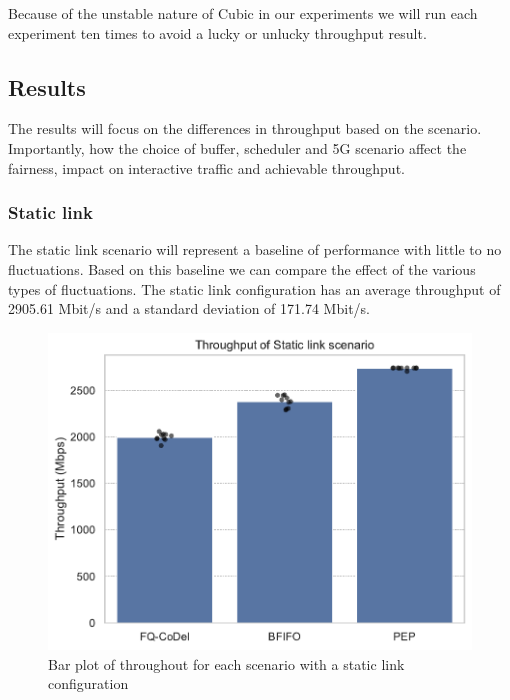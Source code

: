 \documentclass[a4paper,english, 11pt]{report}
\begin{document}
Because of the unstable nature of Cubic in our experiments we will run each experiment ten times to avoid a lucky or unlucky throughput result.



\subsection{Results}
The results will focus on the differences in throughput based on the scenario. Importantly, how the choice of buffer, scheduler and 5G scenario affect the fairness, impact on interactive traffic and achievable throughput. 

\subsubsection{Static link}
The static link scenario will represent a baseline of performance with little to no fluctuations. Based on this baseline we can compare the effect of the various types of fluctuations. The static link configuration has an average throughput of 2905.61 Mbit/s and a standard deviation of 171.74 Mbit/s.\\

\begin{figure}[!h!] %
	\centering
	\includegraphics[scale=0.70]{../diagrams/witestlab/throughput/throughput_sl.pdf}
  	\caption{Bar plot of throughout for each scenario with a static link configuration}
  	\label{fig:throughput_sl}
\end{figure}
\end{document}
